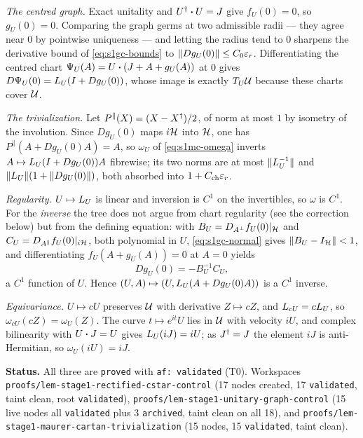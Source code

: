 \emph{The centred graph.} Exact unitality and $U^{\dagger}\mathbin{\bm{\cdot}} U=J$ give $f_U(0)=0$, so
$g_U(0)=0$. Comparing the graph germs at two admissible radii --- they agree near $0$ by
pointwise uniqueness --- and letting the radius tend to $0$ sharpens the derivative bound of
\eqref{eq:s1gc-bounds} to $\lVert Dg_U(0)\rVert\le C_0\varepsilon_r$. Differentiating the centred chart
$\Psi_U(A)=U\mathbin{\bm{\cdot}}(J+A+g_U(A))$ at $0$ gives $D\Psi_U(0)=L_{U}(I+Dg_U(0))$, whose image is
exactly $T_U\mathcal U$ because these charts cover $\mathcal U$.

\emph{The trivialization.} Let $P^{\parallel}(X)=(X-X^{\dagger})/2$, of norm at most $1$ by
isometry of the involution. Since $Dg_U(0)$ maps $i\mathcal H$ into $\mathcal H$, one has
$P^{\parallel}(A+Dg_U(0)A)=A$, so $\omega_U$ of \eqref{eq:s1mc-omega} inverts
$A\mapsto L_{U}(I+Dg_U(0))A$ fibrewise; its two norms are at most
$\lVert L_{U}^{-1}\rVert$ and $\lVert L_{U}\rVert(1+\lVert Dg_U(0)\rVert)$, both absorbed into
$1+C_{\mathrm{ch}}\varepsilon_r$.

\emph{Regularity.} $U\mapsto L_{U}$ is linear and inversion is $C^{1}$ on the invertibles,
so $\omega$ is $C^{1}$. For the \emph{inverse} the tree does not argue from chart regularity
(see the correction below) but from the defining equation: with
$B_U=D_{A^{\perp}}f_U(0)|_{\mathcal H}$ and $C_U=D_{A^{\parallel}}f_U(0)|_{i\mathcal H}$, both
polynomial in $U$, \eqref{eq:s1gc-normal} gives $\lVert B_U-I_{\mathcal H}\rVert<1$, and differentiating
$f_U(A+g_U(A))=0$ at $A=0$ yields
\begin{equation}\label{eq:s1mc-implicit}
  Dg_U(0)=-B_U^{-1}C_U ,
\end{equation}
a $C^{1}$ function of $U$. Hence $(U,A)\mapsto(U,L_{U}(A+Dg_U(0)A))$ is a $C^{1}$ inverse.

\emph{Equivariance.} $U\mapsto cU$ preserves $\mathcal U$ with derivative $Z\mapsto cZ$, and
$L_{cU}=cL_{U}$, so $\omega_{cU}(cZ)=\omega_U(Z)$. The curve $t\mapsto e^{it}U$ lies in
$\mathcal U$ with velocity $iU$, and complex bilinearity with $U\mathbin{\bm{\cdot}} J=U$ gives
$L_{U}(iJ)=iU$; as $J^{\dagger}=J$ the element $iJ$ is anti-Hermitian, so $\omega_U(iU)=iJ$.

\medskip
\noindent\textbf{Status.} All three are \texttt{proved} with \texttt{af: validated} (T0).
Workspaces \texttt{proofs/lem-stage1-rectified-cstar-control} (17 nodes created, 17
\texttt{validated}, taint clean, root \texttt{validated}),
\texttt{proofs/lem-stage1-unitary-graph-control} (15 live nodes all \texttt{validated} plus
3 \texttt{archived}, taint clean on all 18), and
\texttt{proofs/lem-stage1-maurer-cartan-trivialization} (15 nodes, 15 \texttt{validated},
taint clean).

